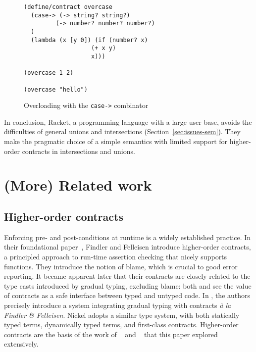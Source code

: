 \documentclass[sigplan,screen,10pt]{acmart}
\newcommand{\unsure}[2][1=]{}
\newcommand{\info}[2][1=]{}
\newcommand{\racket}[1]{\lstinline[language=racket]{#1}}
\begin{document}
\begin{figure}[h]
\begin{lstlisting}[language=racket]
(define/contract overcase
  (case-> (-> string? string?)
         (-> number? number? number?)
  )
  (lambda (x [y 0]) (if (number? x)
                   (+ x y)
                   x)))

(overcase 1 2)

(overcase "hello")
\end{lstlisting}
\caption{Overloading with the \racket{case->} combinator}
\label{fig:racket-case-fun}
\end{figure}

In conclusion, Racket, a programming language with a large user base,
avoids the difficulties of general unions and intersections (Section~\ref{sec:issues-sem}). They make
the pragmatic choice of a simple semantics with limited support for
higher-order contracts in intersections and unions.

\section{(More) Related work}
\label{sec:related-work}
\info{Including a mention of statically typed systems with union}

\unsure{WARNING: what is below is being reworked by Yann}

\subsection{Higher-order contracts}

Enforcing pre- and post-conditions at runtime is a widely established practice.
In their foundational paper~\cite{FindlerFelleisenHOContracts}, Findler and
Felleisen introduce higher-order contracts, a principled approach to run-time
assertion checking that nicely supports functions. They introduce the notion of
blame, which is crucial to good error reporting. It became apparent later that
their contracts are closely related to the type casts introduced by gradual
typing, excluding blame: both \cite{FindlerMultiLang} and
\cite{FelleisenInterLang} see the value of contracts as a safe interface between
typed and untyped code. In \cite{WellTypedBlamed}, the authors precisely
introduce a system integrating gradual typing with contracts \textit{à la
Findler \& Felleisen}. Nickel adopts a similar type system, with both statically
typed terms, dynamically typed terms, and first-class contracts. Higher-order
contracts are the basis of the work of
\citeauthor{KeilThiemannUnionIntersection}~\cite{KeilThiemannUnionIntersection}
and \citeauthor{RootCauseOfBlame}~\cite{RootCauseOfBlame} that this paper
explored extensively.
\end{document}
